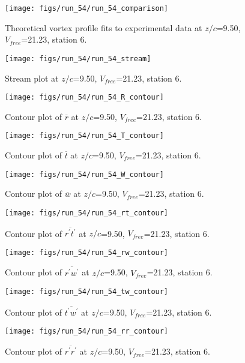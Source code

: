 \begin{figure}[H]
\centering
\texttt{[image: figs/run\_54/run\_54\_comparison]}
\caption{Theoretical vortex profile fits to experimental data at $z/c$=9.50, $V_{free}$=21.23, station 6.}
\end{figure}


\begin{figure}[H]
\centering
\texttt{[image: figs/run\_54/run\_54\_stream]}
\caption{Stream plot at $z/c$=9.50, $V_{free}$=21.23, station 6.}
\end{figure}


\begin{figure}[H]
\centering
\texttt{[image: figs/run\_54/run\_54\_R\_contour]}
\caption{Contour plot of $\overline{r}$ at $z/c$=9.50, $V_{free}$=21.23, station 6.}
\end{figure}


\begin{figure}[H]
\centering
\texttt{[image: figs/run\_54/run\_54\_T\_contour]}
\caption{Contour plot of $\overline{t}$ at $z/c$=9.50, $V_{free}$=21.23, station 6.}
\end{figure}


\begin{figure}[H]
\centering
\texttt{[image: figs/run\_54/run\_54\_W\_contour]}
\caption{Contour plot of $\overline{w}$ at $z/c$=9.50, $V_{free}$=21.23, station 6.}
\end{figure}


\begin{figure}[H]
\centering
\texttt{[image: figs/run\_54/run\_54\_rt\_contour]}
\caption{Contour plot of $\overline{r^\prime t^\prime}$ at $z/c$=9.50, $V_{free}$=21.23, station 6.}
\end{figure}


\begin{figure}[H]
\centering
\texttt{[image: figs/run\_54/run\_54\_rw\_contour]}
\caption{Contour plot of $\overline{r^\prime w^\prime}$ at $z/c$=9.50, $V_{free}$=21.23, station 6.}
\end{figure}


\begin{figure}[H]
\centering
\texttt{[image: figs/run\_54/run\_54\_tw\_contour]}
\caption{Contour plot of $\overline{t^\prime w^\prime}$ at $z/c$=9.50, $V_{free}$=21.23, station 6.}
\end{figure}


\begin{figure}[H]
\centering
\texttt{[image: figs/run\_54/run\_54\_rr\_contour]}
\caption{Contour plot of $\overline{r^\prime r^\prime}$ at $z/c$=9.50, $V_{free}$=21.23, station 6.}
\end{figure}


